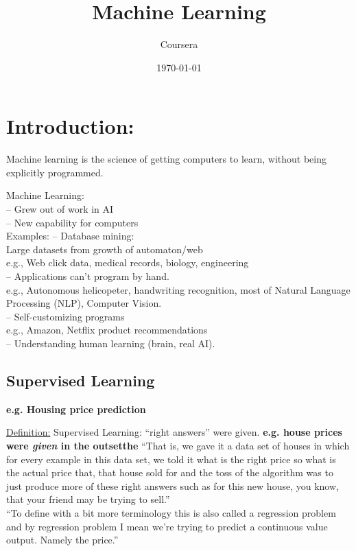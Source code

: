 \documentclass[11pt,a4paper]{article}
\begin{document}
\title{Machine Learning}
\author{Coursera}
\date{\today}
\maketitle


\section{Introduction:}

Machine learning is the science of getting computers to learn, without being explicitly programmed. 

Machine Learning:\\
-- Grew out of work in AI\\
-- New capability for computers\\

Examples: 
-- Database mining: \\
Large datasets from growth of automaton/web\\
e.g., Web click data, medical records, biology, engineering\\
-- Applications can't program by hand.\\
e.g., Autonomous helicopeter, handwriting recognition, most of Natural 
Language Processing (NLP), Computer Vision.\\
-- Self-customizing programs\\
e.g., Amazon, Netflix product recommendations\\
-- Understanding human learning (brain, real AI). \\


\subsection{Supervised Learning}
{\bf e.g. Housing price prediction}

\underline{Definition:} Supervised Learning: ``right answers'' were given. 
{\bf e.g. house prices were {\it given} in the outsetthe }
``That is, we gave it a data set of houses in which for every example in this data set, we told it what is the right price so what is the actual price that, that house sold for and the toss of the algorithm was to just produce more of these right answers such as for this new house, you know, that your friend may be trying to sell.''\\

``To define with a bit more terminology this is also called a regression problem and by regression problem I mean we're trying to predict a continuous value output. Namely the price.'' \\
\end{document}
